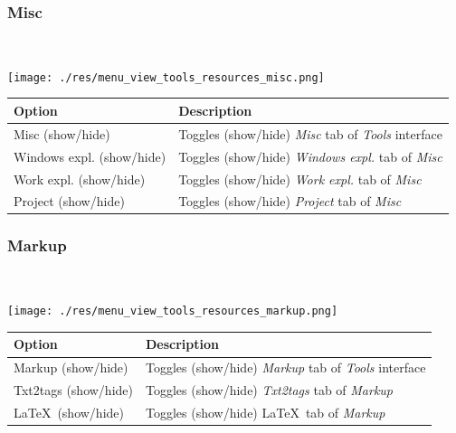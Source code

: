 \newpage
\hypertarget{menu_view_tools_resources_misc}{}
\subsubsection{Misc}\\

\texttt{[image: ./res/menu\_view\_tools\_resources\_misc.png]}\\

\begin{scriptsize}
  \begin{tabularx}{\textwidth}{>{\hsize=0.5\hsize}X>{\hsize=0.7\hsize}X}\\
    \hline
    \textbf{Option} & \textbf{Description} \\
    \hline
    Misc (show/hide) & Toggles (show/hide) \textit{Misc} tab of \textit{Tools} interface \\
    Windows expl. (show/hide) & Toggles (show/hide) \textit{Windows expl.} tab of \textit{Misc} \\
    Work expl. (show/hide) & Toggles (show/hide) \textit{Work expl.} tab of \textit{Misc} \\
    Project (show/hide) & Toggles (show/hide) \textit{Project} tab of \textit{Misc} \\
    \hline
  \end{tabularx}
\end{scriptsize}


\hypertarget{menu_view_tools_resources_markup}{}
\subsubsection{Markup}\\

\texttt{[image: ./res/menu\_view\_tools\_resources\_markup.png]}\\

\begin{scriptsize}
  \begin{tabularx}{\textwidth}{>{\hsize=0.3\hsize}X>{\hsize=0.7\hsize}X}\\
    \hline
    \textbf{Option} & \textbf{Description} \\
    \hline
    Markup (show/hide) & Toggles (show/hide) \textit{Markup} tab of \textit{Tools} interface \\
    Txt2tags (show/hide) & Toggles (show/hide) \textit{Txt2tags} tab of \textit{Markup} \\
    \LaTeX ~(show/hide) & Toggles (show/hide) \LaTeX ~tab of \textit{Markup} \\
    \hline
  \end{tabularx}
\end{scriptsize}


